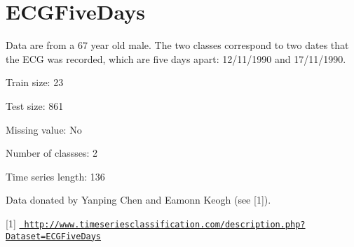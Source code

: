 \chapter{ECGFive\+Days}
\hypertarget{md_external_2data_2UCRArchive__2018_2ECGFiveDays_2README}{}\label{md_external_2data_2UCRArchive__2018_2ECGFiveDays_2README}
\label{md_external_2data_2UCRArchive__2018_2ECGFiveDays_2README_autotoc_md60}%
%
 Data are from a 67 year old male. The two classes correspond to two dates that the ECG was recorded, which are five days apart\+: 12/11/1990 and 17/11/1990.

Train size\+: 23

Test size\+: 861

Missing value\+: No

Number of classses\+: 2

Time series length\+: 136

Data donated by Yanping Chen and Eamonn Keogh (see \mbox{[}1\mbox{]}).

\mbox{[}1\mbox{]} \href{http://www.timeseriesclassification.com/description.php?Dataset=ECGFiveDays}{\texttt{ http\+://www.\+timeseriesclassification.\+com/description.\+php?\+Dataset=\+ECGFive\+Days}} 
